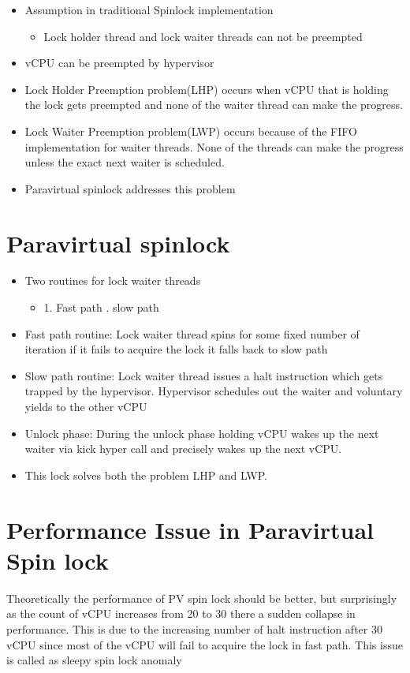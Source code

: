 \documentclass[conference]{IEEEtran}
\begin{document}
\begin{itemize}
\item Assumption in traditional Spinlock implementation 
  \begin{itemize}
    \item Lock holder thread and lock waiter threads can not be preempted
  \end{itemize}
\item vCPU can be preempted by hypervisor
\item Lock Holder Preemption problem(LHP) occurs when vCPU that is holding the
lock gets preempted and none of the waiter thread can make the progress.

\item Lock Waiter Preemption problem(LWP) occurs because of the FIFO
implementation for waiter threads. None of the threads can make the
progress unless the exact next waiter is scheduled.
\item  Paravirtual spinlock addresses this problem
\newline
\end{itemize}

\section{Paravirtual spinlock}
\begin{itemize}
\item Two routines for lock waiter threads
  \begin{itemize}
    \item 1. Fast path . slow path
  \end{itemize}
\item Fast path routine: Lock waiter thread spins for some fixed number of iteration
if it fails to acquire the lock it falls back to slow path
\item Slow path routine: Lock waiter thread issues a halt instruction which gets
trapped by the hypervisor. Hypervisor schedules out the waiter and voluntary
yields to the other vCPU
\item Unlock phase: During the unlock phase holding vCPU wakes up the next
waiter via kick hyper call and precisely wakes up the next vCPU.
\item This lock solves both the problem LHP and LWP.
\newline
\end{itemize}

\section{Performance Issue in Paravirtual Spin lock}
Theoretically the performance of PV spin
lock should be better, but surprisingly as
the count of vCPU increases from 20 to
30 there a sudden collapse in
performance. This is due to the increasing number of
halt instruction after 30 vCPU since most
of the vCPU will fail to acquire the lock in
fast path.
This issue is called as sleepy spin lock
anomaly
\newline
\end{document}
